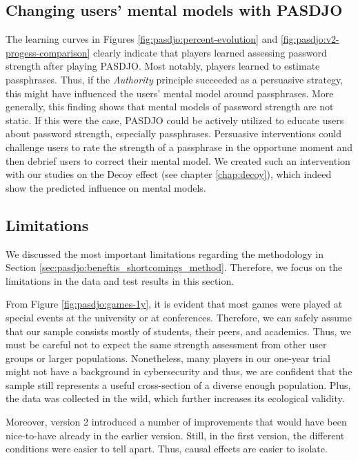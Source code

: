 \subsection{Changing users' mental models with PASDJO}
The learning curves in Figures \ref{fig:pasdjo:percent-evolution} and \ref{fig:pasdjo:v2-progess-comparison} clearly indicate that players learned assessing password strength after playing PASDJO. Most notably, players learned to estimate passphrases. Thus, if the \textit{Authority} principle succeeded as a persuasive strategy, this might have influenced the users' mental model around passphrases. More generally, this finding shows that mental models of password strength are not static. If this were the case, PASDJO could be actively utilized to educate users about password strength, especially passphrases. Persuasive interventions could challenge users to rate the strength of a passphrase in the opportune moment and then debrief users to correct their mental model. We created such an intervention with our studies on the Decoy effect (see chapter \ref{chap:decoy}), which indeed show the predicted influence on mental models. 

\subsection{Limitations}
We discussed the most important limitations regarding the methodology in Section \ref{sec:pasdjo:beneftis_shortcomings_method}. Therefore, we focus on the limitations in the data and test results in this section. 

From Figure \ref{fig:pasdjo:games-1y}, it is evident that most games were played at special events at the university or at conferences. Therefore, we can safely assume that our sample consists mostly of students, their peers, and academics. Thus, we must be careful not to expect the same strength assessment from other user groups or larger populations. Nonetheless, many players in our one-year trial might not have a background in cybersecurity and thus, we are confident that the sample still represents a useful cross-section of a diverse enough population. Plus, the data was collected in the wild, which further increases its ecological validity. 

Moreover, version 2 introduced a number of improvements that would have been nice-to-have already in the earlier version. Still, in the first version, the different conditions were easier to tell apart. Thus, causal effects are easier to isolate. 

